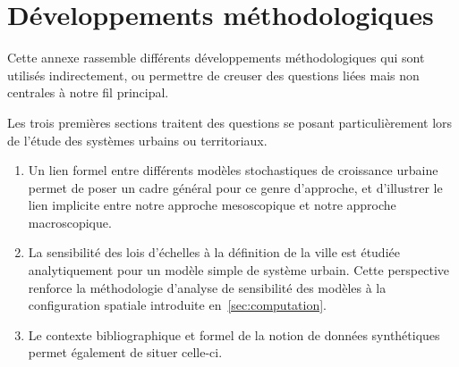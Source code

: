 



\chapter{Développements méthodologiques}




\label{app:methodology} %







Cette annexe rassemble différents développements méthodologiques qui sont utilisés indirectement, ou permettre de creuser des questions liées mais non centrales à notre fil principal.

Les trois premières sections traitent des questions se posant particulièrement lors de l'étude des systèmes urbains ou territoriaux.
\begin{enumerate}
	\item Un lien formel entre différents modèles stochastiques de croissance urbaine permet de poser un cadre général pour ce genre d'approche, et d'illustrer le lien implicite entre notre approche mesoscopique et notre approche macroscopique.
	\item La sensibilité des lois d'échelles à la définition de la ville est étudiée analytiquement pour un modèle simple de système urbain. Cette perspective renforce la méthodologie d'analyse de sensibilité des modèles à la configuration spatiale introduite en~\ref{sec:computation}.
	\item Le contexte bibliographique et formel de la notion de données synthétiques permet également de situer celle-ci.
\end{enumerate}

